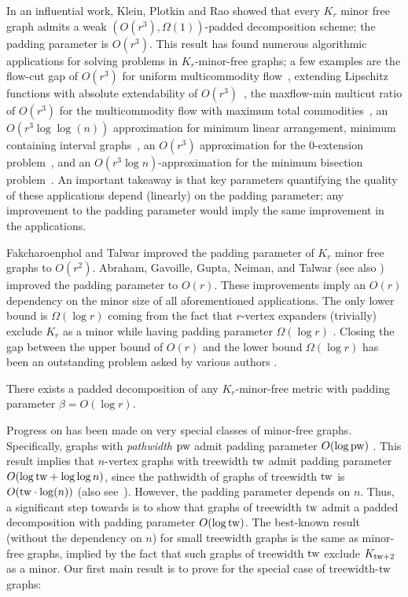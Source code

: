 \documentclass{theoretics}
\newcommand{\tw}{{\rm tw}}
\newcommand{\pw}{{\rm pw}}
\begin{document}
In an influential work, Klein, Plotkin and Rao \cite{KPR93} showed that every $K_r$ minor free graph admits a weak $\left(O(r^3),\Omega(1)\right)$-padded decomposition scheme; the padding parameter is $O(r^3)$.  This result has found numerous algorithmic applications for solving problems in $K_r$-minor-free graphs; a few examples are the flow-cut gap of $O(r^3)$ for uniform multicommodity flow~\cite{KPR93}, extending Lipschitz functions with absolute extendability of $O(r^3)$~\cite{LN05},  the maxflow-min multicut ratio of $O(r^3)$ for the multicommodity flow with maximum total commodities~\cite{TV93}, an $O(r^3 \log\log(n))$ approximation for minimum linear arrangement,  minimum containing interval graphs~\cite{RR05}, an $O(r^3)$ approximation for the 0-extension problem~\cite{CKR04}, and an $O(r^3\log n)$-approximation for the minimum bisection problem~\cite{FK02}. An important takeaway is that key parameters quantifying the quality of these applications depend (linearly) on the padding parameter; any improvement to the padding parameter would imply the same improvement in the applications. 

Fakcharoenphol and Talwar \cite{FT03} improved the padding parameter of $K_r$ minor free graphs to $O(r^2)$.  Abraham, Gavoille, Gupta, Neiman, and Talwar \cite{AGGNT19} (see also \cite{Fil19Approx}) improved the padding parameter to $O(r)$. These improvements imply an $O(r)$ dependency on the minor size of all aforementioned applications. The only lower bound is $\Omega(\log r)$ coming from the fact that $r$-vertex expanders (trivially) exclude $K_r$ as a minor while having padding parameter $\Omega(\log r)$ \cite{Bar96}. Closing the gap between the upper bound of $O(r)$ and the lower bound $\Omega(\log r)$ has been an outstanding problem asked by various authors \cite{FT03,Lee12,AGGNT19,Fil19Approx}.

\begin{conjecture}\label{conj:Lee} There exists a padded decomposition of any $K_r$-minor-free metric with padding parameter $\beta = O(\log r)$.
\end{conjecture}

Progress on  has been made on very special classes of minor-free graphs. Specifically, graphs with \emph{pathwidth} $\pw$ admit padding parameter $O(\log\pw)$ \cite{AGGNT19}. This result implies that $n$-vertex graphs with treewidth $\tw$ admit padding parameter $O(\log\tw+\log\log n)$, since the pathwidth of graphs of treewidth $\tw$ is $O(\tw\cdot \log(n))$ (also see~\cite{KK17}). However, the padding parameter depends on $n$. Thus, a significant step towards  is to show that graphs of treewidth $\tw$ admit a padded decomposition with padding parameter $O(\log\tw)$. The best-known result (without the dependency on $n$) for small treewidth graphs is the same as minor-free graphs, implied by the fact that such graphs of treewidth $\tw$ exclude $K_{\tw+2}$ as a minor.  Our first main result is to prove  for the special case of treewidth-$\tw$ graphs:
\end{document}
